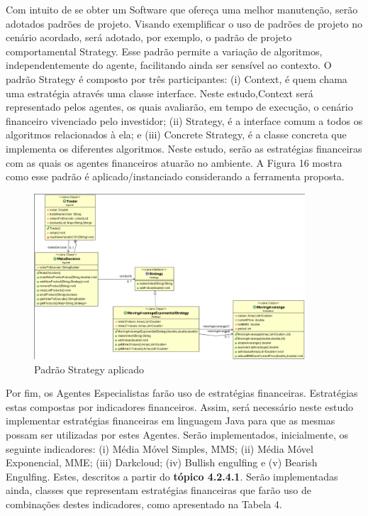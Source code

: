 Com intuito de se obter um Software que ofereça uma melhor manutenção, serão adotados padrões de projeto. Visando exemplificar o uso de padrões de projeto no cenário acordado, será adotado, por exemplo, o padrão de projeto comportamental Strategy. Esse padrão permite a variação de algoritmos, independentemente do agente, facilitando ainda ser sensível ao contexto. O padrão Strategy é composto por três participantes: (i) Context, é quem chama uma estratégia através uma classe interface. Neste estudo,Context será representado pelos agentes, os quais avaliarão, em tempo de execução, o cenário financeiro vivenciado pelo investidor; (ii) Strategy, é a interface comum a todos os algoritmos relacionados à ela; e (iii) Concrete Strategy, é a classe concreta que implementa os diferentes algoritmos. Neste estudo, serão as estratégias financeiras com as quais os agentes financeiros atuarão no ambiente. A Figura 16 mostra como esse padrão é aplicado/instanciado considerando a ferramenta proposta.

\begin{figure}[h]
\centering
\label{f16}
\includegraphics[width=0.9\textwidth]{figuras/f16}
\caption{Padrão Strategy aplicado}
\end{figure}


Por fim, os Agentes Especialistas farão uso de estratégias financeiras. Estratégias estas compostas por indicadores financeiros. Assim, será necessário neste estudo implementar estratégias financeiras em linguagem Java para que as mesmas possam ser utilizadas por estes Agentes.  Serão implementados, inicialmente, os seguinte indicadores: (i) Média Móvel Simples, MMS; (ii) Média Móvel Exponencial, MME; (iii) Darkcloud; (iv) Bullish engulfing  e (v) Bearish Engulfing. Estes, descritos a partir do \textbf{tópico 4.2.4.1}. Serão implementadas ainda, classes que representam estratégias financeiras que farão uso de combinações destes indicadores, como apresentado na Tabela 4.


